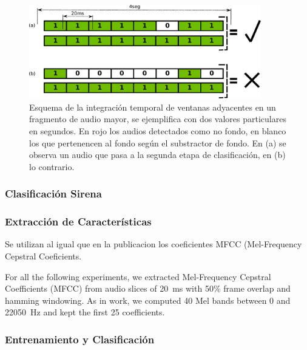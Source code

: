 \documentclass{article}
\begin{document}
\begin{figure}[h]
\begin{center}
\includegraphics[width=0.9\textwidth]{integracion_temporal} 
\caption{Esquema de la integración temporal de ventanas adyacentes en un fragmento de audio mayor, se ejemplifica con dos valores particulares en segundos. En rojo los audios detectados como no fondo, en blanco los que pertenencen al fondo según el substractor de fondo. En (a) se observa un audio que pasa a la segunda etapa de clasificación, en (b) lo contrario.}
\label{fig:integracion_temporal}
\end{center}
\end{figure}
 
\subsubsection{Clasificación Sirena}

\subsubsection*{Extracción de Características}
Se utilizan al igual que en la publicacion \cite{Salamon:UrbanSound:ACMMM:14} los coeficientes MFCC (Mel-Frequency Cepstral Coeficients. 

For all the following experiments, we extracted Mel-Frequency Cepstral Coefficients (MFCC) from audio slices of \SI{20}{\milli\second} with 50\% frame overlap and hamming windowing. As in  work, we computed 40 Mel bands between 0 and \SI{22050}{\Hz} and kept the first 25 coefficients. 

\subsubsection*{Entrenamiento y Clasificación}


\end{document}
